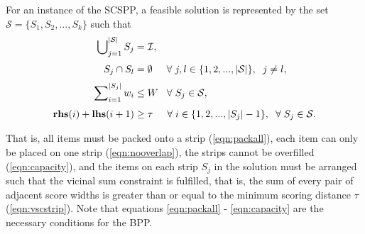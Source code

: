 \documentclass[oribibl]{llncs}
\begin{document}
For an instance of the SCSPP, a feasible solution is represented by the set $\mathcal{S} = \{S_1, S_2, ..., S_k\}$ such that
\begin{subequations}
	\begin{align}
		\bigcup\nolimits_{j=1}^{|\mathcal{S}|} S_j &= \mathcal{I}, \label{eqn:packall}\\[3pt]
		S_j \cap S_l &= \emptyset \hspace{5mm} \forall \hspace{1mm} j, l \in \{1, 2, ..., |\mathcal{S}|\}, \hspace{2mm} j \neq l, \label{eqn:nooverlap} \\[3pt]
		\sum\nolimits_{i=1}^{|S_j|}w_i & \leq W \hspace{3mm} \forall \hspace{1mm} S_j \in \mathcal{S}, \label{eqn:capacity} \\[3pt]
		\textup{\textbf{rhs}}(i) + \textup{\textbf{lhs}}(i+1) &\geq \tau \hspace {5mm} \forall \hspace{1mm} i \in \{1, 2, ..., |S_j|-1\}, \hspace{2mm} \forall \hspace{1mm} S_j \in \mathcal{S}. \label{eqn:vscstrip}
\end{align}
\end{subequations}

That is, all items must be packed onto a strip (\ref{eqn:packall}), each item can only be placed on one strip (\ref{eqn:nooverlap}), the strips cannot be overfilled (\ref{eqn:capacity}), and the items on each strip $S_j$ in the solution must be arranged such that the vicinal sum constraint is fulfilled, that is, the sum of every pair of adjacent score widths is greater than or equal to the minimum scoring distance $\tau$ (\ref{eqn:vscstrip}). Note that equations \ref{eqn:packall} - \ref{eqn:capacity} are the necessary conditions for the BPP.
\end{document}
